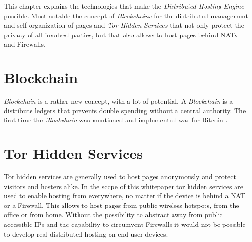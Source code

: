 
This chapter explains the technologies that make the \textit{Distributed
Hosting Engine} possible. Most notable the concept of \textit{Blockchains} for
the distributed management and self-organization of pages and \textit{Tor
Hidden Services} that not only protect the privacy of all involved parties,
but that also allows to host pages behind NATs and Firewalls.

\section{Blockchain}

\textit{Blockchain} is a rather new concept, with a lot of potential. A
\textit{Blockchain} is a distribute ledgers that prevents double spending without a central authority. The first time the \textit{Blockchain} was mentioned and implemented was for Bitcoin \cite{nakamoto2008bitcoin}.

\section{Tor Hidden Services}

Tor hidden services are generally used to host pages anonymously and protect
visitors and hosters alike. In the scope of this whitepaper tor hidden
services are used to enable hosting from everywhere, no matter if the device
is behind a NAT or a Firewall. This allows to host pages from public wireless
hotspots, from the office or from home. Without the possibility to abstract
away from public accessible IPs and the capability to circumvent Firewalls it
would not be possible to develop real distributed hosting on end-user devices.
